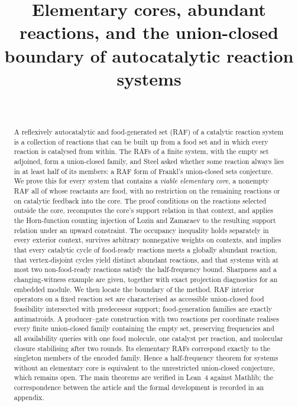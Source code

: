 \documentclass[11pt,a4paper]{article}
\title{Elementary cores, abundant reactions, and the union-closed\\ boundary of autocatalytic reaction systems}
\author{\PaperAuthor\\[2pt] {\small\itshape \PaperAffiliation}}
\date{\PaperDate}
\theoremstyle{plain}
\theoremstyle{definition}
\theoremstyle{remark}
\begin{document}
\maketitle

\begin{abstract}
A reflexively autocatalytic and food-generated set (RAF) of a catalytic reaction
system is a collection of reactions that can be built up from a food set and in
which every reaction is catalysed from within. The RAFs of a finite system, with
the empty set adjoined, form a union-closed family, and Steel asked whether some
reaction always lies in at least half of its members: a RAF form of Frankl's
union-closed sets conjecture. We prove this for every system that contains a
\emph{viable elementary core}, a nonempty RAF all of whose reactants are food,
with no restriction on the remaining reactions or on catalytic feedback into
the core. The proof conditions on the reactions selected outside the core,
recomputes the core's support relation in that context, and applies the
Horn-function counting injection of Lozin and Zamaraev to the resulting support
relation under an upward constraint. The occupancy inequality holds separately in every
exterior context, survives arbitrary nonnegative weights on contexts, and
implies that every catalytic cycle of food-ready reactions meets a globally
abundant reaction, that vertex-disjoint cycles yield distinct abundant
reactions, and that systems with at most two non-food-ready reactions satisfy
the half-frequency bound. Sharpness and a changing-witness example are given,
together with exact projection diagnostics for an embedded module.
We then locate the boundary of the method. RAF interior operators on a fixed
reaction set are characterised as accessible union-closed food feasibility
intersected with predecessor support; food-generation families are exactly
antimatroids. A producer--gate construction with two reactions per coordinate
realises every finite union-closed family containing the empty set, preserving
frequencies and all availability queries with one food molecule, one catalyst per
reaction, and molecular closure stabilising after two rounds. Its elementary RAFs
correspond exactly to the singleton members of the encoded family. Hence a
half-frequency theorem for systems without an elementary core is equivalent to the
unrestricted union-closed conjecture, which remains open. The main theorems are
verified in Lean~4 against Mathlib; the correspondence between the article and
the formal development is recorded in an appendix.
\end{abstract}
\end{document}
